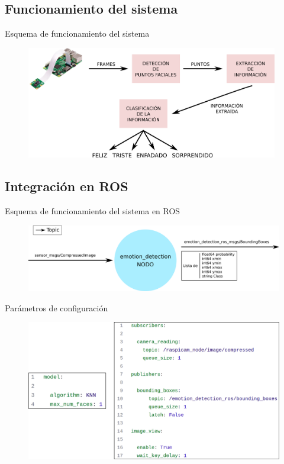\documentclass{beamer}
\begin{document}
\subsection{Funcionamiento del sistema}
\begin{frame}{Esquema de funcionamiento del sistema}
\begin{figure}
    \begin{center}
        \includegraphics[width=11cm]{figs/func.png}
    \end{center}
\end{figure}
\end{frame}

\subsection{Integración en ROS}
\begin{frame}{Esquema de funcionamiento del sistema en ROS}
\begin{figure}
    \begin{center}
        \includegraphics[width=12cm]{figs/paquete_ros.png}
    \end{center}
\end{figure}
\end{frame}

\begin{frame}{Parámetros de configuración}
\begin{figure}
  \centering
  \includegraphics[width=12cm]{figs/yamls.png}
\end{figure}
\end{frame}
\end{document}
